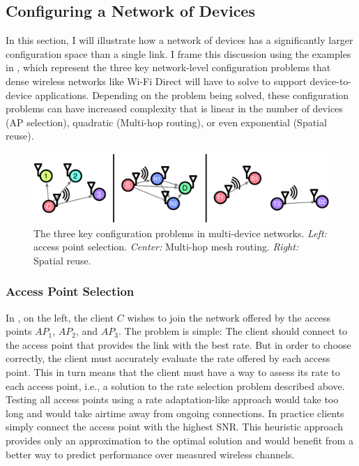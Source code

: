 \subsection{Configuring a Network of Devices}
\label{sec:intro_network_problems}
In this section, I will illustrate how a network of devices has a significantly larger configuration space than a single link. I frame this discussion using the examples in , which represent the three key network-level configuration problems that dense wireless networks like Wi-Fi Direct will have to solve to support device-to-device applications. Depending on the problem being solved, these configuration problems can have increased complexity that is linear in the number of devices (AP selection), quadratic (Multi-hop routing), or even exponential (Spatial reuse).

\begin{figure}[tp]
	\centering
	\includegraphics[width=\textwidth]{figures/introduction/network.pdf}
	\caption[The three key configuration problems in multi-device networks]{\label{fig:network_examples} The three key configuration problems in multi-device networks. \textit{Left:} access point selection. \textit{Center:} Multi-hop mesh routing. \textit{Right:} Spatial reuse. }
\end{figure}

\subsubsection{Access Point Selection}
In , on the left, the client $C$ wishes to join the network offered by the access points $AP_1$, $AP_2$, and $AP_3$. The  problem is simple: The client should connect to the access point that provides the link with the best rate. But in order to choose correctly, the client must accurately evaluate the rate offered by each access point. This in turn means that the client must have a way to assess its rate to each access point, i.e., a solution to the rate selection problem described above. Testing all access points using a rate adaptation-like approach would take too long and would take airtime away from ongoing connections. In practice clients simply connect the access point with the highest SNR\@. This heuristic approach provides only an approximation to the optimal solution and would benefit from a better way to predict performance over measured wireless channels.

